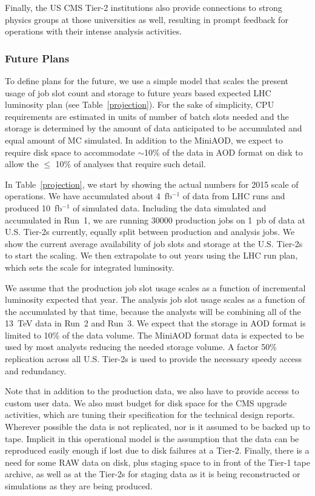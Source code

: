 \documentclass[11pt,a4paper]{article}
\begin{document}
Finally, the US CMS Tier-2 institutions also provide connections to strong
physics groups at those universities as well, resulting in prompt feedback
for operations with their intense analysis activities.

\subsubsection{Future Plans}


To define plans for the future, we use a simple model that scales
the present usage of job slot count and storage to future years based
expected LHC  luminosity plan (see Table~\ref{projection}).
For the sake of simplicity, CPU requirements are estimated in units of number of 
batch slots needed and the storage is determined by the amount of
data anticipated to be accumulated and equal amount of MC simulated.
In addition to the MiniAOD, we expect to require disk space to accommodate 
$\sim$10\% of the data in AOD format on disk to allow the $\le$ 10\% of 
analyses that require such detail.

In Table~\ref{projection}, we start by showing the actual numbers for
2015 scale of operations.  We have accumulated about 4~fb$^{-1}$
of data from LHC runs and produced 10~fb$^{-1}$ of simulated data.
Including the data simulated and accumulated in Run~1, we are running
30000 production jobs on 1~pb of data at U.S. Tier-2s currently,
equally split between production and analysis jobs.  We show the
current average availability of job slots and storage at the U.S. Tier-2s to
start the scaling.  We then extrapolate to out years using the
LHC run plan, which sets the scale for integrated luminosity.

We assume that the production job slot usage scales as a function of 
incremental luminosity expected that year.  The analysis job slot usage
scales as a function of the accumulated by that time, because the analysts
will be combining all of the 13~TeV data in Run~2 and Run~3.
We expect that the storage in AOD format is limited to 10\% of
the data volume.  The MiniAOD format data is expected to be
used by most analysts reducing the needed storage volume.  A
factor 50\% replication across all U.S. Tier-2s is used to provide 
the necessary speedy access and redundancy.

Note that in addition to the production data, we also have to provide
access to custom user data.  We also must budget for disk space for 
the CMS upgrade activities, which are tuning their specification
for the technical design reports.  Wherever possible the data is not replicated, 
nor is it assumed to be  backed up to tape. Implicit in this operational model 
is the assumption that the data can be reproduced easily enough if lost due 
to disk failures at a Tier-2.  Finally, there is a need for some RAW data on disk, 
plus staging space to in front of the Tier-1 tape archive, as well as at the Tier-2s
for staging data as it is being reconstructed or simulations as they are being 
produced. 
\end{document}
